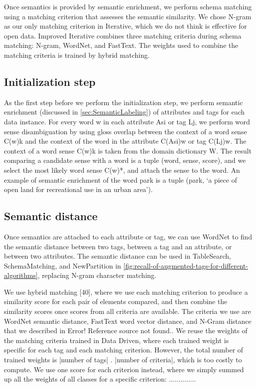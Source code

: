 Once semantics is provided by semantic enrichment, we perform schema matching using a matching criterion that assesses the semantic similarity. We chose N-gram as our only matching criterion in Iterative, which we do not think is effective for open data. Improved Iterative combines three matching criteria during schema matching: N-gram, WordNet, and FastText. The weights used to combine the matching criteria is trained by hybrid matching.

\subsection{Initialization step}

As the first step before we perform the initialization step, we perform semantic enrichment (discussed in \autoref{sec:SemanticLabeling}) of attributes and tags for each data instance. For every word w in each attribute Asi or tag Lj, we perform word sense disambiguation by using gloss overlap between the context of a word sense C(w)k and the context of the word in the attribute C(Asi)w or tag C(Lj)w. The context of a word sense C(w)k is taken from the domain dictionary W. The result comparing a candidate sense with a word is a tuple (word, sense, score), and we select the most likely word sense C(w)*, and attach the sense to the word. An example of semantic enrichment of the word park is a tuple (park, `a piece of open land for recreational use in an urban area').

\subsection{Semantic distance}

Once semantics are attached to each attribute or tag, we can use WordNet to find the semantic distance between two tags, between a tag and an attribute, or between two attributes. The semantic distance can be used in TableSearch, SchemaMatching, and NewPartition in \autoref{fig:recall-of-augmented-tags-for-different-algorithms}, replacing N-gram character matching.

We use hybrid matching \cite{Rahm2001Survey}[40], where we use each matching criterion to produce a similarity score for each pair of elements compared, and then combine the similarity scores once scores from all criteria are available. The criteria we use are WordNet semantic distance, FastText word vector distance, and N-Gram distance that we described in Error! Reference source not found.. We reuse the weights of the matching criteria trained in Data Driven, where each trained weight is specific for each tag and each matching criterion. However, the total number of trained weights is |number of tags| . |number of criteria|, which is too costly to compute. We use one score for each criterion instead, where we simply summed up all the weights of all classes for a specific criterion: ..............

